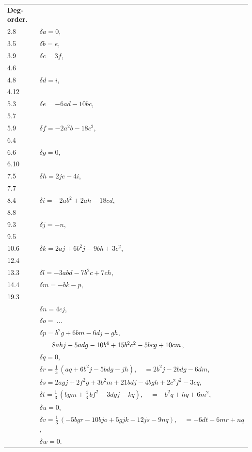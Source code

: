 \documentclass[11pt]{article}
\begin{document}
\noindent\begin{tabular}{l@{\quad}l}
\textbf{Deg-order.} & \\
2.8\ \ & $\delta a=0$, \\
3.5\ \ & $\delta b=e$, \\
3.9\ \ & $\delta c=3f$, \\
4.6\ \ & \\
4.8\ \ & $\delta d=i$, \\
4.12\ \ & \\
5.3\ \ & $\delta e=-6ad-10bc$, \\
5.7\ \ & \\
5.9\ \ & $\delta f=-2a^{2}b-18c^{2}$, \\
6.4\ \ & \\
6.6\ \ & $\delta g=0$, \\
6.10\ \ & \\
7.5\ \ & $\delta h=2je-4i$, \\
7.7\ \ & \\
8.4\ \ & $\delta i=-2ab^{2}+2ah-18cd$, \\
8.8\ \ & \\
9.3\ \ & $\delta j=-n$, \\
9.5\ \ & \\
10.6\ \ & $\delta k=2aj+6b^{2}j-9bh+3c^{2}$, \\
12.4\ \ & \\
13.3\ \ & $\delta l=-3abd-7b^{2}c+7ch$, \\
14.4\ \ & $\delta m=-bk-p$, \\
19.3\ \ & \\
 & $\delta n=4cj$, \\
 & $\delta o=\ \ldots$ \\
 & $\delta p=b^{2}g+6bm-6dj-gh$, \\
 & $\hspace{1.8em} 8ahj-5adg-10b^{4}+15b^{2}c^{2}-5bcg+10cm$, \\
 & $\delta q=0$, \\
 & $\delta r=\tfrac{1}{3}\,(aq+6b^{2}j-5bdg-jh),\quad =2b^{2}j-2bdg-6dm$, \\
 & $\delta s=2agj+2f^{2}g+3b^{2}m+21bdj-4bgh+2c^{2}f^{2}-3cq$, \\
 & $\delta t=\tfrac{1}{3}\,(bgm+\tfrac{4}{3}\,bf^{2}-3dgj-kq),\quad =-b^{2}q+hq+6m^{2}$, \\
 & $\delta u=0$, \\
 & $\delta v=\tfrac{1}{3}\,(-5bgr-10bjo+5gjk-12js-9nq),\quad =-6dt-6mr+nq$, \\
 & $\delta w=0$.
\end{tabular}
\end{document}
